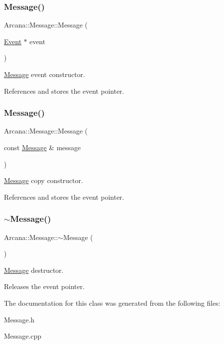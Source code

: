 \subsubsection{\texorpdfstring{Message()}{Message()}\hspace{0.1cm}{\footnotesize\ttfamily [1/2]}}
{\footnotesize\ttfamily Arcana\+::\+Message\+::\+Message (\begin{DoxyParamCaption}\item[{\mbox{\hyperlink{class_arcana_1_1_event}{Event}} $\ast$}]{event }\end{DoxyParamCaption})}



\mbox{\hyperlink{class_arcana_1_1_message}{Message}} event constructor. 

References and stores the event pointer. \mbox{\label{class_arcana_1_1_message_a4c1cb77c70947ff48b6f54f83b94e141}} 
\subsubsection{\texorpdfstring{Message()}{Message()}\hspace{0.1cm}{\footnotesize\ttfamily [2/2]}}
{\footnotesize\ttfamily Arcana\+::\+Message\+::\+Message (\begin{DoxyParamCaption}\item[{const \mbox{\hyperlink{class_arcana_1_1_message}{Message}} \&}]{message }\end{DoxyParamCaption})}



\mbox{\hyperlink{class_arcana_1_1_message}{Message}} copy constructor. 

References and stores the event pointer. \mbox{\label{class_arcana_1_1_message_a08fee1d23b404de28250cc3e61bdef6b}} 
\subsubsection{\texorpdfstring{$\sim$\+Message()}{~Message()}}
{\footnotesize\ttfamily Arcana\+::\+Message\+::$\sim$\+Message (\begin{DoxyParamCaption}{ }\end{DoxyParamCaption})}



\mbox{\hyperlink{class_arcana_1_1_message}{Message}} destructor. 

Releases the event pointer. 

The documentation for this class was generated from the following files\+:\begin{DoxyCompactItemize}
\item 
Message.\+h\item 
Message.\+cpp\end{DoxyCompactItemize}
